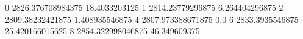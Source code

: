 0 2826.376708984375 18.4033203125
1 2814.23779296875 6.264404296875
2 2809.38232421875 1.408935546875
4 2807.973388671875 0.0
6 2833.3935546875 25.420166015625
8 2854.322998046875 46.349609375
